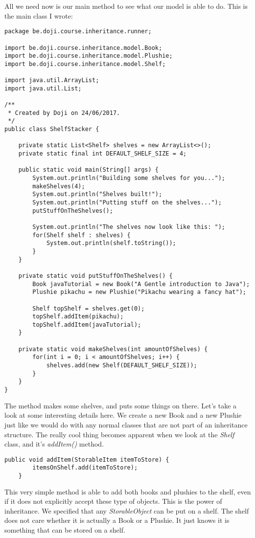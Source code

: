 \documentclass[11pt,fleqn]{book} %
\begin{document}
\pargraph{}All we need now is our main method to see what our model is able to do. This is the main class I wrote:

\begin{lstlisting}
package be.doji.course.inheritance.runner;

import be.doji.course.inheritance.model.Book;
import be.doji.course.inheritance.model.Plushie;
import be.doji.course.inheritance.model.Shelf;

import java.util.ArrayList;
import java.util.List;

/**
 * Created by Doji on 24/06/2017.
 */
public class ShelfStacker {

    private static List<Shelf> shelves = new ArrayList<>();
    private static final int DEFAULT_SHELF_SIZE = 4;

    public static void main(String[] args) {
        System.out.println("Building some shelves for you...");
        makeShelves(4);
        System.out.println("Shelves built!");
        System.out.println("Putting stuff on the shelves...");
        putStuffOnTheShelves();

        System.out.println("The shelves now look like this: ");
        for(Shelf shelf : shelves) {
            System.out.println(shelf.toString());
        }
    }

    private static void putStuffOnTheShelves() {
        Book javaTutorial = new Book("A Gentle introduction to Java");
        Plushie pikachu = new Plushie("Pikachu wearing a fancy hat");

        Shelf topShelf = shelves.get(0);
        topShelf.addItem(pikachu);
        topShelf.addItem(javaTutorial);
    }

    private static void makeShelves(int amountOfShelves) {
        for(int i = 0; i < amountOfShelves; i++) {
            shelves.add(new Shelf(DEFAULT_SHELF_SIZE));
        }
    }
}
\end{lstlisting}
The method makes some shelves, and puts some things on there. 
Let's take a look at some interesting details here. We create a new Book and a new Plushie just like we would do with any normal classes that are not part of an inheritance structure.
The really cool thing becomes apparent when we look at the \emph{Shelf} class, and it's \emph{addItem()} method.
\begin{lstlisting}
public void addItem(StorableItem itemToStore) {
        itemsOnShelf.add(itemToStore);
    }
\end{lstlisting}
This very simple method is able to add both books and plushies to the shelf, even if it does not explicitly accept these type of objects. This is the power of inheritance. We specified that any \emph{StorableObject} can be put on a shelf. The shelf does not care whether it is actually a Book or a Plushie. It just knows it is something that can be stored on a shelf.
\end{document}

